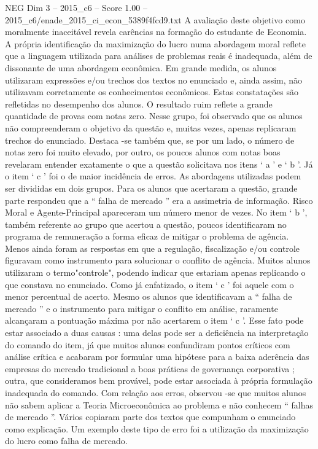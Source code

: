 \begin{textsample}{NEG Dim 3 – 2015\_c6 – Score 1.00 – 2015\_c6/enade\_2015\_ci\_econ\_5389f4fcd9.txt}
A avaliação deste objetivo como moralmente inaceitável revela carências na formação do estudante de Economia.
A própria identificação da maximização do lucro numa abordagem moral reflete que a linguagem utilizada para análises de problemas reais é inadequada, além de dissonante de uma abordagem econômica.
Em grande medida, os alunos utilizaram expressões e/ou trechos dos textos no enunciado e, ainda assim, não utilizavam corretamente os conhecimentos econômicos.
Estas constatações são refletidas no desempenho dos alunos.
O resultado ruim reflete a grande quantidade de provas com notas zero.
Nesse grupo, foi observado que os alunos não compreenderam o objetivo da questão e, muitas vezes, apenas replicaram trechos do enunciado.
Destaca -se também que, se por um lado, o número de notas zero foi muito elevado, por outro, os poucos alunos com notas boas revelaram entender exatamente o que a questão solicitava nos itens ‘ a ’ e ‘ b ’.
Já o item ‘ c ’ foi o de maior incidência de erros.
As abordagens utilizadas podem ser divididas em dois grupos.
Para os alunos que acertaram a questão, grande parte respondeu que a “ falha de mercado ” era a assimetria de informação.
Risco Moral e Agente-Principal apareceram um número menor de vezes.
No item ‘ b ’, também referente ao grupo que acertou a questão, poucos identificaram no programa de remuneração a forma eficaz de mitigar o problema de agência.
Menos ainda foram as respostas em que a regulação, fiscalização e/ou controle figuravam como instrumento para solucionar o conflito de agência.
Muitos alunos utilizaram o termo"controle", podendo indicar que estariam apenas replicando o que constava no enunciado.
Como já enfatizado, o item ‘ c ’ foi aquele com o menor percentual de acerto.
Mesmo os alunos que identificavam a “ falha de mercado ” e o instrumento para mitigar o conflito em análise, raramente alcançaram a pontuação máxima por não acertarem o item ‘ c ’.
Esse fato pode estar associado a duas causas : uma delas pode ser a deficiência na interpretação do comando do item, já que muitos alunos confundiram pontos críticos com análise crítica e acabaram por formular uma hipótese para a baixa aderência das empresas do mercado tradicional a boas práticas de governança corporativa ; outra, que consideramos bem provável, pode estar associada à própria formulação inadequada do comando.
Com relação aos erros, observou -se que muitos alunos não sabem aplicar a Teoria Microeconômica ao problema e não conhecem “ falhas de mercado ”.
Vários copiaram parte dos textos que compunham o enunciado como explicação.
Um exemplo deste tipo de erro foi a utilização da maximização do lucro como falha de mercado.

\end{textsample}
